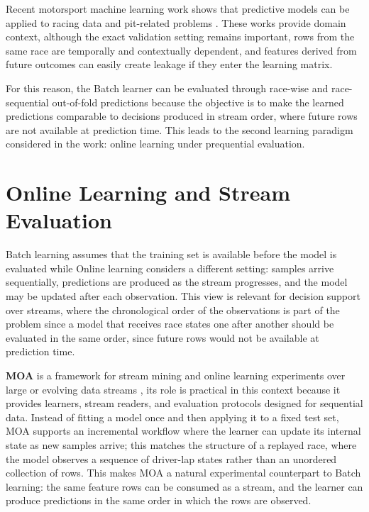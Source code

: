 Recent motorsport machine learning work shows that predictive models can be applied to racing data and pit-related problems
\citep{sasikumar2025pitstop,hettmann2024datatopodium,dinh2025gradient}. These works provide domain context, although the exact validation setting remains important,
rows from the same race are temporally and contextually dependent, and features derived from future outcomes can easily create leakage if they enter the learning matrix.

For this reason, the Batch learner can be evaluated through race-wise and race-sequential out-of-fold predictions because the objective is to make the learned predictions comparable
to decisions produced in stream order, where future rows are not available at prediction time. This leads to the second learning paradigm considered in the work: online
learning under prequential evaluation.


\section{Online Learning and Stream Evaluation}

Batch learning assumes that the training set is available before the model is evaluated while Online learning considers a different setting:
samples arrive sequentially, predictions are produced as the stream progresses, and the model may be updated after each observation. This view is relevant for
decision support over streams, where the chronological order of the observations is part of the problem since a model that receives race states one after another should be
evaluated in the same order, since future rows would not be available at prediction time.

\textbf{MOA} is a framework for stream mining and online learning experiments over large or evolving data streams \citep{bifet2010moa}, its role is practical in this context because
it provides learners, stream readers, and evaluation protocols designed for sequential data. Instead of fitting a model once and then applying it to a fixed test set, MOA
supports an incremental workflow where the learner can update its internal state as new samples arrive; this matches the structure of a replayed race, where the model observes
a sequence of driver-lap states rather than an unordered collection of rows.
This makes MOA a natural experimental counterpart to Batch learning: the same feature rows can be consumed as a stream, and the learner can produce predictions in the
same order in which the rows are observed.

